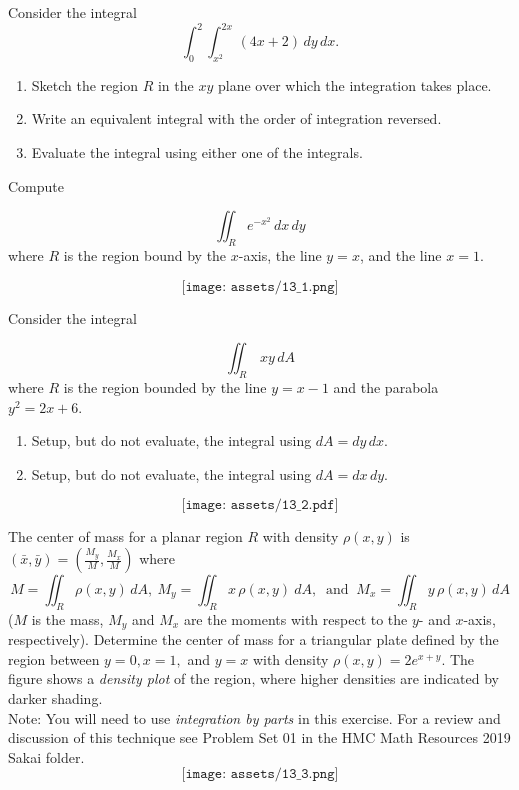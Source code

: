\documentclass[12pt,letterpaper]{hmcpset}
\newcommand{\ds}{\displaystyle}
\begin{document}

\begin{problem}[1]
Consider the integral
\[ \int_0^2 \int_{x^2}^{2x} \, (4 x + 2) \, dy \, dx.  \]
\begin{enumerate}[label=(\alph*)]
\item Sketch the region $R$ in the $xy$ plane over which the integration takes place.
\item Write an equivalent integral with the order of integration reversed. 
\item Evaluate the integral using either one of the integrals.
\end{enumerate}
\end{problem}
\clearpage

\begin{problem}[2]
  Compute \\[1ex]
  \parbox{0.5\textwidth}{
\[  \iint_{R} e^{-x^2} \, dx \, dy \] 
where $R$ is the  region bound by the $x$-axis, the line $y=x$, and the line $x=1$.
\vspace{0.45in}
} \parbox{0.5\textwidth}{
\[ \texttt{[image: assets/13\_1.png]} \]
}
\end{problem}
\clearpage

\begin{problem}[3] Consider the integral \\[1ex]
  \parbox{0.45\textwidth}{ \[  \iint_{R} \, xy \, dA \]
where $R$ is the region bounded by the line $y = x - 1$ and the parabola $y^2 = 2 x + 6$.
\begin{enumerate}
\item Setup, but do not evaluate, the integral using $dA = dy \, dx$.
\item Setup, but do not evaluate, the integral using  $dA = dx \, dy$. 
\end{enumerate}
\vspace{0.25in}
}
\parbox{0.5\textwidth}{
\[  \texttt{[image: assets/13\_2.pdf]}  \]
}
\end{problem}
\clearpage

\begin{problem}[4]
  The center of mass for a planar region $R$ with density $\rho(x,y)$ is 
$\ds (\bar{x},\bar{y}) = \left(\frac{M_y}{M}, \frac{M_x}{M}\right) $
where
\[  M = \iint_{R} \rho(x,y) \, dA, \ M_y = \iint_R x \, \rho(x,y) \ dA, \ \text{ and } \ M_x = \iint_R y \, \rho(x,y) \, dA  \]
($M$ is the mass, $M_y$ and $M_x$ are the moments with respect to the $y$- and $x$-axis, respectively). 
Determine the center of mass for a triangular plate defined by the region between $y=0, x=1,$ and $y=x$ with density $\rho(x,y) = 2e^{x+y}$.
The figure shows a \textit{density plot} of the region, where higher densities are indicated by darker shading.\\

 Note: You will need to use \textit{integration by parts} in this exercise. For a review and discussion of this technique see Problem Set 01 in the HMC Math Resources 2019 Sakai folder.
 \[ \texttt{[image: assets/13\_3.png]} \]
\end{problem}
\clearpage
\end{document}
